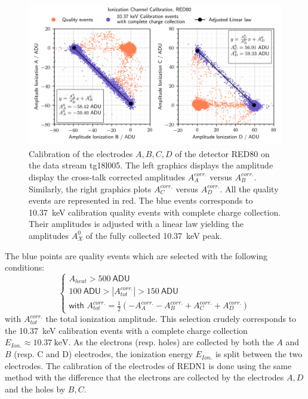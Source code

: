 \begin{figure}
\centering
\includegraphics[scale=1]{Figures/ElectrodesExperimental/ion_calibration.png}
\caption{Calibration of the electrodes $A,B,C,D$ of the detector RED80 on the data stream tg18l005. The left graphics displays the amplitude display the cross-talk corrected amplitudes $A_A^{corr.}$ versus $A_B^{corr.}$. Similarly, the right graphics plots $A_C^{corr.}$ versus $A_D^{corr.}$. All the quality events are represented in red. The blue events corresponds to \SI{10.37}{\kilo\eV} calibration quality events with complete charge collection. Their amplitudes is adjusted with a linear law yielding the amplitudes $A_X^0$ of the fully collected \SI{10.37}{\kilo\eV} peak.}
\label{fig:ion-calibration}
\end{figure}

The blue points are quality events which are selected with the following conditions:
\begin{equation}
\begin{cases}
A_{heat} > \SI{500}{\textsf{ADU}} \\
\SI{100}{\textsf{ADU}} > |A_{tot}^{corr.}| > \SI{150}{\textsf{ADU}} \\
\textsf{with  } A_{tot}^{corr.} = \frac{1}{2} \left( -A_A^{corr.}-A_B^{corr.}+A_C^{corr.}+A_D^{corr.} \right)
\end{cases}
\end{equation}
with $A_{tot}^{corr.}$ the total ionization amplitude. This selection crudely corresponds to the \SI{10.37}{\kilo\eV} calibration events with a complete charge collection $E_{Ion.} \approx \SI{10.37}{\kilo\eV}$. As the electrons (resp. holes) are collected by both the $A$ and $B$ (resp. C and D) electrodes, the ionization energy $E_{Ion.}$ is split between the two electrodes. The calibration of the electrodes of REDN1 is done using the same method with the difference that the electrons are collected by the electrodes $A,D$ and the holes by $B,C$.

